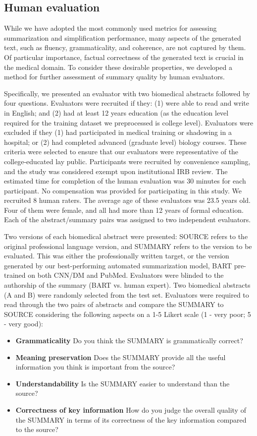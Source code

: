 \documentclass[letterpaper, table]{article} %
\begin{document}
\subsection{Human evaluation}
While we have adopted the most commonly used metrics for assessing summarization and simplification performance, many aspects of the generated text, such as fluency, grammaticality, and coherence, are not captured by them. Of particular importance, factual correctness of the generated text is crucial in the medical domain. To consider these desirable properties, we developed a method for further assessment of summary quality by human evaluators.


Specifically, we presented an evaluator with two biomedical abstracts followed by four questions. Evaluators were recruited if they: (1) were able to read and write in English; and (2) had at least 12 years education (as the education level required for the training dataset we preprocessed is college level). Evaluators were excluded if they (1) had participated in medical training or shadowing in a hospital; or (2) had completed advanced (graduate level) biology courses. These criteria were selected to ensure that our evaluators were representative of the college-educated lay public. Participants were recruited by convenience sampling, and the study was considered exempt upon institutional IRB review. The estimated time for completion of the human evaluation was 30 minutes for each participant. No compensation was provided for participating in this study.  We recruited 8 human raters.
The average age of these evaluators was 23.5 years old. Four of them were female, and all had more than 12 years of formal education. Each of the abstract/summary pairs was assigned to two independent evaluators.

Two versions of each biomedical abstract were presented: SOURCE refers to the original professional language version, and SUMMARY refers to the version to be evaluated. This was either the professionally written target, or the version generated by our best-performing automated summarization model, BART pre-trained on both CNN/DM and PubMed. Evaluators were blinded to the authorship of the summary (BART vs. human expert). Two biomedical abstracts (A and B) were randomly selected from the test set. Evaluators were required to read through the two pairs of abstracts and compare the SUMMARY to SOURCE considering the following aspects on a 1-5 Likert scale (1 - very poor; 5 - very good):
\begin{itemize}
\item \textbf{Grammaticality} Do you think the SUMMARY is grammatically correct?
\item \textbf{Meaning preservation} Does the SUMMARY provide all the useful information you think is important from the source?
\item \textbf{Understandability} Is the SUMMARY easier to understand than the source?
\item \textbf{Correctness of key information} How do you judge the overall quality of the SUMMARY in terms of its correctness of the key information compared to the source?
\end{itemize}
\end{document}
